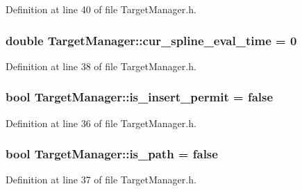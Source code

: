 Definition at line 40 of file Target\+Manager.\+h.

\subsubsection[{\texorpdfstring{cur\+\_\+spline\+\_\+eval\+\_\+time}{cur_spline_eval_time}}]{\setlength{\rightskip}{0pt plus 5cm}double Target\+Manager\+::cur\+\_\+spline\+\_\+eval\+\_\+time = 0}\hypertarget{class_target_manager_a65817ac2f2ce483a7218e903bdfe5c67}{}\label{class_target_manager_a65817ac2f2ce483a7218e903bdfe5c67}


Definition at line 38 of file Target\+Manager.\+h.

\subsubsection[{\texorpdfstring{is\+\_\+insert\+\_\+permit}{is_insert_permit}}]{\setlength{\rightskip}{0pt plus 5cm}bool Target\+Manager\+::is\+\_\+insert\+\_\+permit = false}\hypertarget{class_target_manager_adf8a01c0942c3aac0445403d8f0f4cce}{}\label{class_target_manager_adf8a01c0942c3aac0445403d8f0f4cce}


Definition at line 36 of file Target\+Manager.\+h.

\subsubsection[{\texorpdfstring{is\+\_\+path}{is_path}}]{\setlength{\rightskip}{0pt plus 5cm}bool Target\+Manager\+::is\+\_\+path = false}\hypertarget{class_target_manager_a507af7ce1ac562510c1b907553a2e596}{}\label{class_target_manager_a507af7ce1ac562510c1b907553a2e596}


Definition at line 37 of file Target\+Manager.\+h.

